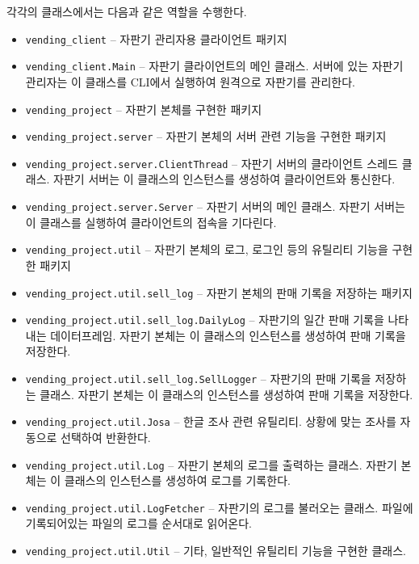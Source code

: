 \documentclass{oblivoir}
\begin{document}
    각각의 클래스에서는 다음과 같은 역할을 수행한다.
    \begin{itemize}
        \item \texttt{vending\_client} -- 자판기 관리자용 클라이언트 패키지
        \item \texttt{vending\_client.Main} --
        자판기 클라이언트의 메인 클래스.
        서버에 있는 자판기 관리자는 이 클래스를 CLI에서 실행하여 원격으로 자판기를 관리한다.
        \item \texttt{vending\_project} -- 자판기 본체를 구현한 패키지
        \item \texttt{vending\_project.server} -- 자판기 본체의 서버 관련 기능을 구현한 패키지
        \item \texttt{vending\_project.server.ClientThread} --
        자판기 서버의 클라이언트 스레드 클래스.
        자판기 서버는 이 클래스의 인스턴스를 생성하여 클라이언트와 통신한다.
        \item \texttt{vending\_project.server.Server} --
        자판기 서버의 메인 클래스.
        자판기 서버는 이 클래스를 실행하여 클라이언트의 접속을 기다린다.
        \item \texttt{vending\_project.util} -- 자판기 본체의 로그, 로그인 등의 유틸리티 기능을 구현한 패키지
        \item \texttt{vending\_project.util.sell\_log} -- 자판기 본체의 판매 기록을 저장하는 패키지
        \item \texttt{vending\_project.util.sell\_log.DailyLog} --
        자판기의 일간 판매 기록을 나타내는 데이터프레임.
        자판기 본체는 이 클래스의 인스턴스를 생성하여 판매 기록을 저장한다.
        \item \texttt{vending\_project.util.sell\_log.SellLogger} --
        자판기의 판매 기록을 저장하는 클래스.
        자판기 본체는 이 클래스의 인스턴스를 생성하여 판매 기록을 저장한다.
        \item \texttt{vending\_project.util.Josa} --
        한글 조사 관련 유틸리티.
        상황에 맞는 조사를 자동으로 선택하여 반환한다.
        \item \texttt{vending\_project.util.Log} --
        자판기 본체의 로그를 출력하는 클래스.
        자판기 본체는 이 클래스의 인스턴스를 생성하여 로그를 기록한다.
        \item \texttt{vending\_project.util.LogFetcher} --
        자판기의 로그를 불러오는 클래스.
        파일에 기록되어있는 파일의 로그를 순서대로 읽어온다.
        \item \texttt{vending\_project.util.Util} --
        기타, 일반적인 유틸리티 기능을 구현한 클래스.

\end{itemize}
\end{document}
